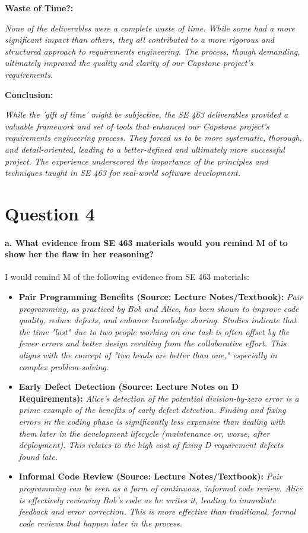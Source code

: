 \documentclass{article}
\begin{document}
\textbf{Waste of Time?:}

\textit{None of the deliverables were a complete waste of time. While some had a more significant impact than others, they all contributed to a more rigorous and structured approach to requirements engineering. The process, though demanding, ultimately improved the quality and clarity of our Capstone project's requirements.}

\textbf{Conclusion:}

\textit{While the 'gift of time' might be subjective, the SE 463 deliverables provided a valuable framework and set of tools that enhanced our Capstone project's requirements engineering process. They forced us to be more systematic, thorough, and detail-oriented, leading to a better-defined and ultimately more successful project. The experience underscored the importance of the principles and techniques taught in SE 463 for real-world software development.}

\section*{Question 4}

\paragraph{a. What evidence from SE 463 materials would you remind M of to show her the flaw in her reasoning?}

I would remind M of the following evidence from SE 463 materials:

\begin{itemize}
    \item \textbf{Pair Programming Benefits (Source: Lecture Notes/Textbook):} \textit{Pair programming, as practiced by Bob and Alice, has been shown to improve code quality, reduce defects, and enhance knowledge sharing. Studies indicate that the time "lost" due to two people working on one task is often offset by the fewer errors and better design resulting from the collaborative effort. This aligns with the concept of "two heads are better than one," especially in complex problem-solving.}
    \item \textbf{Early Defect Detection (Source: Lecture Notes on D Requirements):} \textit{Alice's detection of the potential division-by-zero error is a prime example of the benefits of early defect detection. Finding and fixing errors in the coding phase is significantly less expensive than dealing with them later in the development lifecycle (maintenance or, worse, after deployment). This relates to the high cost of fixing D requirement defects found late.}
    \item \textbf{Informal Code Review (Source: Lecture Notes/Textbook):} \textit{Pair programming can be seen as a form of continuous, informal code review. Alice is effectively reviewing Bob's code as he writes it, leading to immediate feedback and error correction. This is more effective than traditional, formal code reviews that happen later in the process.}
\end{itemize}
\end{document}
